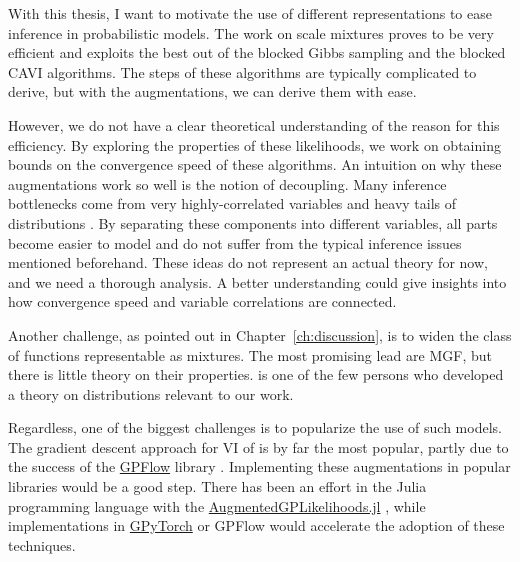 

\graphicspath{{9_conclusion/figures/}}
With this thesis, I want to motivate the use of different representations to ease inference in probabilistic models.
The work on scale mixtures proves to be very efficient and exploits the best out of the blocked Gibbs sampling and the blocked \ac{CAVI} algorithms.
The steps of these algorithms are typically complicated to derive, but with the augmentations, we can derive them with ease. 

However, we do not have a clear theoretical understanding of the reason for this efficiency. 
By exploring the properties of these likelihoods, we work on obtaining bounds on the convergence speed of these algorithms.
An intuition on why these augmentations work so well is the notion of decoupling.
Many inference bottlenecks come from very highly-correlated variables and heavy tails of distributions \cite{betancourt2017conceptual}.
By separating these components into different variables, all parts become easier to model and do not suffer from the typical inference issues mentioned beforehand.
These ideas do not represent an actual theory for now, and we need a thorough analysis.
A better understanding could give insights into how convergence speed and variable correlations are connected.

Another challenge, as pointed out in Chapter~\ref{ch:discussion}, is to widen the class of functions representable as mixtures.
The most promising lead are \acf{MGF}, but there is little theory on their properties.
\citet{schwartz1952transformation} is one of the few persons who developed a theory on distributions relevant to our work.

Regardless, one of the biggest challenges is to popularize the use of such models.
The gradient descent approach for \ac{VI} of \citet{Hensman2015} is by far the most popular, partly due to the success of the \href{https://github.com/GPflow/GPflow}{GPFlow} library \cite{GPflow2017}.
Implementing these augmentations in popular libraries would be a good step.
There has been an effort in the Julia programming language \cite{Julia-2017} with the \href{https://github.com/JuliaGaussianProcesses/AugmentedGPLikelihoods.jl}{AugmentedGPLikelihoods.jl} \cite{theo_galy_fajou_2022_6347022}, while implementations in \href{https://gpytorch.ai/}{GPyTorch} \cite{gardner2018gpytorch} or GPFlow would accelerate the adoption of these techniques.


